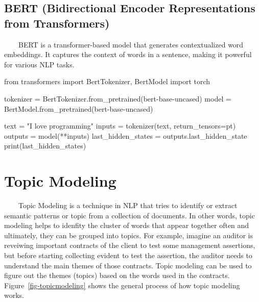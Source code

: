 \documentclass[
  letterpaper,
  DIV=11,
  numbers=noendperiod]{scrreprt}
\newenvironment{Shaded}{\begin{snugshade}}{\end{snugshade}}
\newcommand{\BuiltInTok}[1]{\textcolor[rgb]{0.00,0.23,0.31}{#1}}
\newcommand{\ImportTok}[1]{\textcolor[rgb]{0.00,0.46,0.62}{#1}}
\newcommand{\NormalTok}[1]{\textcolor[rgb]{0.00,0.23,0.31}{#1}}
\newcommand{\OperatorTok}[1]{\textcolor[rgb]{0.37,0.37,0.37}{#1}}
\newcommand{\StringTok}[1]{\textcolor[rgb]{0.13,0.47,0.30}{#1}}
\begin{document}
\subsection{BERT (Bidirectional Encoder Representations from
Transformers)}\label{bert-bidirectional-encoder-representations-from-transformers}

~~~~BERT is a transformer-based model that generates contextualized word
embeddings. It captures the context of words in a sentence, making it
powerful for various NLP tasks.

\begin{Shaded}
\begin{Highlighting}[]
\ImportTok{from}\NormalTok{ transformers }\ImportTok{import}\NormalTok{ BertTokenizer, BertModel}
\ImportTok{import}\NormalTok{ torch}

\NormalTok{tokenizer }\OperatorTok{=}\NormalTok{ BertTokenizer.from\_pretrained(}\StringTok{\textquotesingle{}bert{-}base{-}uncased\textquotesingle{}}\NormalTok{)}
\NormalTok{model }\OperatorTok{=}\NormalTok{ BertModel.from\_pretrained(}\StringTok{\textquotesingle{}bert{-}base{-}uncased\textquotesingle{}}\NormalTok{)}

\NormalTok{text }\OperatorTok{=} \StringTok{"I love programming"}
\NormalTok{inputs }\OperatorTok{=}\NormalTok{ tokenizer(text, return\_tensors}\OperatorTok{=}\StringTok{\textquotesingle{}pt\textquotesingle{}}\NormalTok{)}
\NormalTok{outputs }\OperatorTok{=}\NormalTok{ model(}\OperatorTok{**}\NormalTok{inputs)}
\NormalTok{last\_hidden\_states }\OperatorTok{=}\NormalTok{ outputs.last\_hidden\_state}
\BuiltInTok{print}\NormalTok{(last\_hidden\_states)}
\end{Highlighting}
\end{Shaded}

\section{Topic Modeling}\label{topic-modeling}

~~~~Topic Modeling is a technique in NLP that tries to identify or
extract semantic patterns or topic from a collection of documents. In
other words, topic modeling helps to idenfity the cluster of words that
appear together often and ultimately, they can be grouped into topics.
For example, imagine an auditor is reveiwing important contracts of the
client to test some management assertions, but before starting
collecting evident to test the assertion, the auditor needs to
understand the main themes of those contracts. Topic modeling can be
used to figure out the themes (topics) based on the words used in the
contracts. Figure~\ref{fig-topicmodeling} shows the general process of
how topic modeling works.
\end{document}
